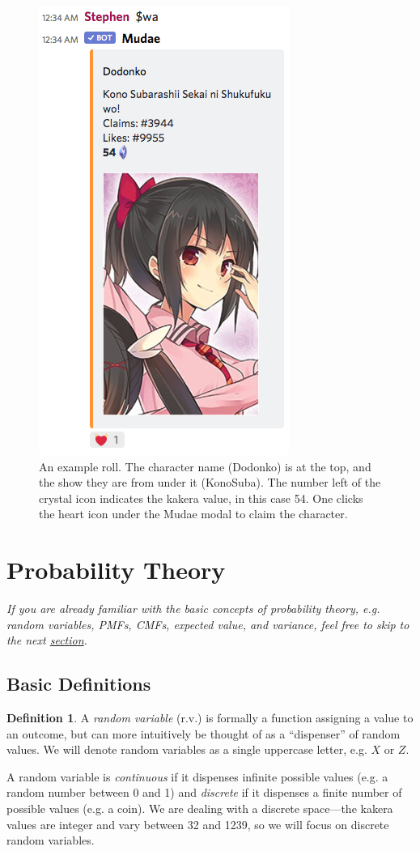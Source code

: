 \documentclass[11pt, oneside]{article}
\theoremstyle{plain}
\theoremstyle{definition}
\newtheorem{definition}{Definition}[section]
\begin{document}
\begin{figure}
  \centering
  \includegraphics[scale=0.6]{mudae}
  \caption{An example roll. The character name (Dodonko) is at the top, and the
  show they are from under it (KonoSuba). The number left of the crystal icon
  indicates the kakera value, in this case 54. One clicks the heart icon under
  the Mudae modal to claim the character.}
\end{figure}

\section{Probability Theory}
\textit{If you are already familiar with the basic concepts of probability
theory, e.g. random variables, PMFs, CMFs, expected value, and variance,
feel free to skip to the next \hyperref[subsec:computer]{section}.}

\subsection{Basic Definitions}
\begin{definition}
  A \textit{random variable} (r.v.) is formally a function assigning
  a value to an outcome, but can more intuitively be thought of as a
  \enquote{dispenser} of random values. We will denote random variables
  as a single uppercase letter, e.g. \( X \) or \( Z \).
  
  A random variable is \textit{continuous} if it dispenses infinite possible
  values (e.g. a random number between 0 and 1) and \textit{discrete} if it
  dispenses a finite number of possible values (e.g. a coin). We are dealing
  with a discrete space---the kakera values are integer and vary between 32
  and 1239, so we will focus on discrete random variables.
\end{definition}
\end{document}

